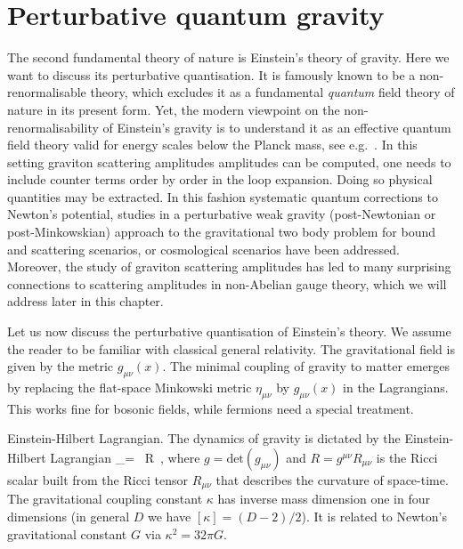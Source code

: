 \section{Perturbative quantum gravity}
\label{sec:1.4}

The second fundamental theory of nature is Einstein's theory of gravity. Here we want to
discuss its perturbative quantisation.
It is famously known to be a non-renormalisable theory, which excludes it as a 
fundamental \emph{quantum} field theory of nature in its present form. Yet,
the modern viewpoint on the non-renormalisability of Einstein's gravity is to  
understand it as an effective quantum field theory valid
for energy scales below the Planck mass, see e.g.~\cite{ch1_Donoghue:1994dn}. 
 In this setting graviton scattering amplitudes  
 amplitudes can be computed, one needs to include counter
  terms order by order in the loop expansion.
Doing so physical quantities may be extracted. In this fashion systematic 
quantum corrections to Newton's potential, studies 
in a perturbative weak gravity (post-Newtonian or post-Minkowskian)
approach to the gravitational two body problem for bound and scattering scenarios,
or cosmological scenarios have been addressed.
Moreover, the study of graviton scattering
amplitudes has led to many surprising connections to scattering
amplitudes in non-Abelian gauge theory, which we will address later in this chapter. 

Let us now discuss the perturbative quantisation of Einstein's theory. We assume the
reader to be familiar with classical general relativity.
The gravitational field is given by the metric $g_{\mu\nu}(x)$. The minimal coupling of
gravity to matter emerges by replacing the flat-space Minkowski metric $\eta_{\mu\nu}$
by $g_{\mu\nu}(x)$ in the Lagrangians. This works fine for bosonic fields, while fermions
need a special treatment.


\begin{important}{Einstein-Hilbert Lagrangian.}
The dynamics of gravity is dictated by the Einstein-Hilbert Lagrangian
%
\be
\label{EinsteinHilbert}
_{}=  \, R \,,
\ee
where $g=\text{det}(g_{\mu\nu})$ and $R=g^{\mu\nu}R_{\mu\nu}$ is the Ricci scalar
built from the Ricci tensor $R_{\mu\nu}$ that describes the
curvature of space-time. The gravitational coupling constant $\kappa$ has inverse mass dimension one in four dimensions 
(in general $D$ we have $[\kappa]=(D-2)/2$). It is related to Newton's gravitational constant $G$ via $\kappa^{2}=32\pi G$. 
\end{important}

